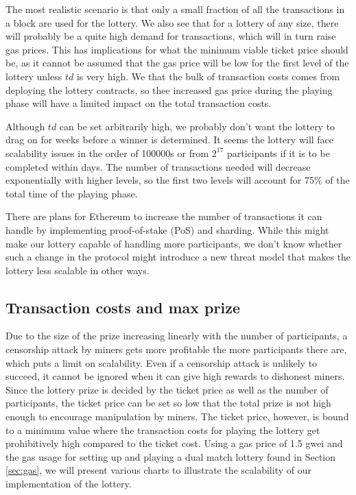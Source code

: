The most realistic scenario is that only a small fraction of all the transactions in a block are used for the lottery. We also see that for a lottery of any size, there will probably be a quite high demand for transactions, which will in turn raise gas prices. This has implications for what the minimum viable ticket price should be, as it cannot be assumed that the gas price will be low for the first level of the lottery unless $td$ is very high. We that the bulk of transaction costs comes from deploying the lottery contracts, so thee increased gas price during the playing phase will have a limited impact on the total transaction costs.

Although $td$ can be set arbitrarily high, we probably don't want the lottery to drag on for weeks before a winner is determined. It seems the lottery will face scalability issues in the order of 100000s or from $2^{17}$ participants if it is to be completed within days. The number of transactions needed will decrease exponentially with higher levels, so the first two levels will account for 75\% of the total time of the playing phase. 

There are plans for Ethereum to increase the number of transactions it can handle by implementing proof-of-stake (PoS) and sharding. While this might make our lottery capable of handling more participants, we don't know whether such a change in the protocol might introduce a new threat model that makes the lottery less scalable in other ways.

\subsection{Transaction costs and max prize}

Due to the size of the prize increasing linearly with the number of participants, a censorship attack by miners gets more profitable the more participants there are, which puts a limit on scalability. Even if a censorship attack is unlikely to succeed, it cannot be ignored when it can give high rewards to dishonest miners. Since the lottery prize is decided by the ticket price as well as the number of participants, the ticket price can be set so low that the total prize is not high enough to encourage manipulation by miners. The ticket price, however, is bound to a minimum value where the transaction costs for playing the lottery get prohibitively high compared to the ticket cost. Using a gas price of 1.5 gwei and the gas usage for setting up and playing a dual match lottery found in Section \ref{sec:gas}, we will present various charts to illustrate the scalability of our implementation of the lottery.

